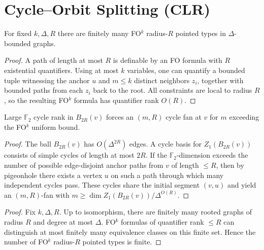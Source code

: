 \section*{Cycle--Orbit Splitting (CLR)}

\begin{lemma}
For fixed $k,\Delta,R$ there are finitely many FO$^k$ radius-$R$ pointed types in $\Delta$-bounded graphs.
\end{lemma}

\begin{proof}
A path of length at most $R$ is definable by an FO formula with $R$ existential quantifiers.
Using at most $k$ variables, one can quantify a bounded tuple witnessing the anchor $u$ and
$m\le k$ distinct neighbors $z_i$, together with bounded paths from each $z_i$ back to the root.
All constraints are local to radius $R$, so the resulting FO$^k$ formula has quantifier rank $O(R)$.
\end{proof}

\begin{lemma}
Large $\mathbb F_2$ cycle rank in $B_{2R}(v)$ forces an $(m,R)$ cycle fan at $v$ for $m$ exceeding the FO$^k$ uniform bound.
\end{lemma}

\begin{proof}
The ball $B_{2R}(v)$ has $O(\Delta^{2R})$ edges.
A cycle basis for $Z_1(B_{2R}(v))$ consists of simple cycles of length at most $2R$.
If the $\mathbb F_2$-dimension exceeds the number of possible edge-disjoint anchor paths from $v$ of length $\le R$,
then by pigeonhole there exists a vertex $u$ on such a path through which many independent cycles pass.
These cycles share the initial segment $(v,u)$ and yield an $(m,R)$-fan with
$m \ge \dim Z_1(B_{2R}(v))/\Delta^{O(R)}$.
\end{proof}

\begin{proof}
Fix $k,\Delta,R$. Up to isomorphism, there are finitely many rooted graphs of radius $R$ and degree at most $\Delta$.
FO$^k$ formulas of quantifier rank $\le R$ can distinguish at most finitely many equivalence classes on this finite set.
Hence the number of FO$^k$ radius-$R$ pointed types is finite.
\end{proof}

